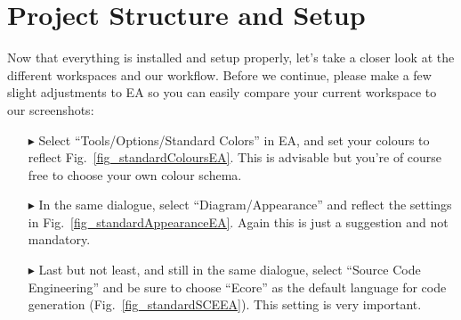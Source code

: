 \section{Project Structure and Setup}
Now that everything is installed and setup properly, let's take a closer look at
the different workspaces and our workflow.  Before we continue, please make
a few slight adjustments to EA so you can easily compare your current workspace 
to our screenshots:
\begin{itemize}
  \item[$\blacktriangleright$] Select ``Tools/Options/Standard Colors'' in EA,
  and set your colours to reflect Fig.~\ref{fig_standardColoursEA}.  This is
  advisable but you're of course free to choose your own colour schema.
  \item[$\blacktriangleright$] In the same dialogue, select
  ``Diagram/Appearance'' and reflect the settings in
  Fig.~\ref{fig_standardAppearanceEA}.  Again this is just a suggestion and not
  mandatory.
  \item[$\blacktriangleright$] Last but not least, and still in the same
  dialogue, select ``Source Code Engineering'' and be sure to choose ``Ecore''
  as the default language for code generation (Fig.~\ref{fig_standardSCEEA}). 
  This setting is very important.
\end{itemize}
\newpage
